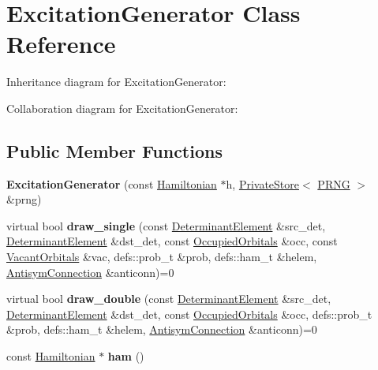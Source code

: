\hypertarget{classExcitationGenerator}{}\section{Excitation\+Generator Class Reference}
\label{classExcitationGenerator}


Inheritance diagram for Excitation\+Generator\+:


Collaboration diagram for Excitation\+Generator\+:
\subsection*{Public Member Functions}
\begin{DoxyCompactItemize}
\item 
{\bfseries Excitation\+Generator} (const \hyperlink{classHamiltonian}{Hamiltonian} $\ast$h, \hyperlink{classPrivateStore}{Private\+Store}$<$ \hyperlink{classPRNG}{P\+R\+NG} $>$ \&prng)\hypertarget{classExcitationGenerator_a49314ec4f317bc05a590a58df558aa27}{}\label{classExcitationGenerator_a49314ec4f317bc05a590a58df558aa27}

\item 
virtual bool {\bfseries draw\+\_\+single} (const \hyperlink{classDeterminantElement}{Determinant\+Element} \&src\+\_\+det, \hyperlink{classDeterminantElement}{Determinant\+Element} \&dst\+\_\+det, const \hyperlink{structOccupiedOrbitals}{Occupied\+Orbitals} \&occ, const \hyperlink{structVacantOrbitals}{Vacant\+Orbitals} \&vac, defs\+::prob\+\_\+t \&prob, defs\+::ham\+\_\+t \&helem, \hyperlink{classAntisymConnection}{Antisym\+Connection} \&anticonn)=0\hypertarget{classExcitationGenerator_a86f874210eb5787bdaf8de158118bfb6}{}\label{classExcitationGenerator_a86f874210eb5787bdaf8de158118bfb6}

\item 
virtual bool {\bfseries draw\+\_\+double} (const \hyperlink{classDeterminantElement}{Determinant\+Element} \&src\+\_\+det, \hyperlink{classDeterminantElement}{Determinant\+Element} \&dst\+\_\+det, const \hyperlink{structOccupiedOrbitals}{Occupied\+Orbitals} \&occ, defs\+::prob\+\_\+t \&prob, defs\+::ham\+\_\+t \&helem, \hyperlink{classAntisymConnection}{Antisym\+Connection} \&anticonn)=0\hypertarget{classExcitationGenerator_ab87bd71e269a1c1205ae88c1cff935fc}{}\label{classExcitationGenerator_ab87bd71e269a1c1205ae88c1cff935fc}

\item 
const \hyperlink{classHamiltonian}{Hamiltonian} $\ast$ {\bfseries ham} ()\hypertarget{classExcitationGenerator_ad80becb637e39c2f70af2e1af0e8d628}{}\label{classExcitationGenerator_ad80becb637e39c2f70af2e1af0e8d628}

\end{DoxyCompactItemize}
